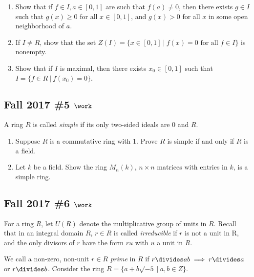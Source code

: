 \begin{enumerate}
\def\labelenumi{\alph{enumi}.}
\item
  Show that if \(f \in I, a \in [0, 1]\) are such that \(f (a) \neq 0\),
  then there exists \(g \in I\) such that \(g(x) \geq 0\) for all
  \(x \in [0, 1]\), and \(g(x) > 0\) for all \(x\) in some open
  neighborhood of \(a\).
\item
  If \(I \neq R\), show that the set
  \(Z(I) = \{x \in [0, 1] {~\mathrel{\Big|}~}f(x) = 0 \text{ for all } f \in I\}\)
  is nonempty.
\item
  Show that if \(I\) is maximal, then there exists \(x_0 \in [0, 1]\)
  such that \(I = \{ f \in R {~\mathrel{\Big|}~}f (x_0 ) = 0\}\).
\end{enumerate}

\hypertarget{fall-2017-5-work}{%
\subsection{\texorpdfstring{Fall 2017 \#5
\(\work\)}{Fall 2017 \#5 \textbackslash work}}\label{fall-2017-5-work}}

A ring \(R\) is called \emph{simple} if its only two-sided ideals are
\(0\) and \(R\).

\begin{enumerate}
\def\labelenumi{\alph{enumi}.}
\item
  Suppose \(R\) is a commutative ring with 1. Prove \(R\) is simple if
  and only if \(R\) is a field.
\item
  Let \(k\) be a field. Show the ring \(M_n (k)\), \(n \times n\)
  matrices with entries in \(k\), is a simple ring.
\end{enumerate}

\hypertarget{fall-2017-6-work}{%
\subsection{\texorpdfstring{Fall 2017 \#6
\(\work\)}{Fall 2017 \#6 \textbackslash work}}\label{fall-2017-6-work}}

For a ring \(R\), let \(U(R)\) denote the multiplicative group of units
in \(R\). Recall that in an integral domain \(R\), \(r \in R\) is called
\emph{irreducible} if \(r\) is not a unit in R, and the only divisors of
\(r\) have the form \(ru\) with \(u\) a unit in \(R\).

We call a non-zero, non-unit \(r \in R\) \emph{prime} in \(R\) if
\(r \divides ab \implies r \divides a\) or \(r \divides b\). Consider
the ring \(R = \{a + b \sqrt{-5}{~\mathrel{\Big|}~}a, b \in Z\}\).

